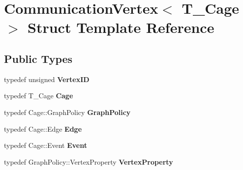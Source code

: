 \hypertarget{structCommunicationVertex}{}\section{Communication\+Vertex$<$ T\+\_\+\+Cage $>$ Struct Template Reference}
\label{structCommunicationVertex}
\subsection*{Public Types}
\begin{DoxyCompactItemize}
\item 
\hypertarget{structCommunicationVertex_aa8e4d0fd17c1947dd3a631ee6fa4f3cd}{}typedef unsigned {\bfseries Vertex\+I\+D}\label{structCommunicationVertex_aa8e4d0fd17c1947dd3a631ee6fa4f3cd}

\item 
\hypertarget{structCommunicationVertex_abe667b52bf7dbf37b5d9dad568274ec8}{}typedef T\+\_\+\+Cage {\bfseries Cage}\label{structCommunicationVertex_abe667b52bf7dbf37b5d9dad568274ec8}

\item 
\hypertarget{structCommunicationVertex_ab287653758a0732b6864146c393aeefd}{}typedef Cage\+::\+Graph\+Policy {\bfseries Graph\+Policy}\label{structCommunicationVertex_ab287653758a0732b6864146c393aeefd}

\item 
\hypertarget{structCommunicationVertex_a84e0fffdb071f9734f3af84cc3069629}{}typedef Cage\+::\+Edge {\bfseries Edge}\label{structCommunicationVertex_a84e0fffdb071f9734f3af84cc3069629}

\item 
\hypertarget{structCommunicationVertex_ae895383be74775cad052c1a0bb70c772}{}typedef Cage\+::\+Event {\bfseries Event}\label{structCommunicationVertex_ae895383be74775cad052c1a0bb70c772}

\item 
\hypertarget{structCommunicationVertex_a5d8ffebe6eebc88c248eb0c6964f1c37}{}typedef Graph\+Policy\+::\+Vertex\+Property {\bfseries Vertex\+Property}\label{structCommunicationVertex_a5d8ffebe6eebc88c248eb0c6964f1c37}

\end{DoxyCompactItemize}
